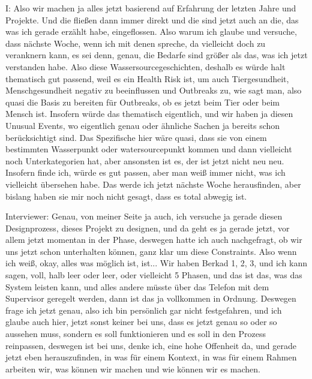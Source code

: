 I: Also wir machen ja alles jetzt basierend auf Erfahrung der letzten Jahre und Projekte. Und die fließen dann immer direkt und die sind jetzt auch an die, das was ich gerade erz{\"a}hlt habe, eingeflossen. Also warum ich glaube und versuche, dass n{\"a}chste Woche, wenn ich mit denen spreche, da vielleicht doch zu veranknern kann, es sei denn, genau, die Bedarfe sind gr{\"o}ßer als das, was ich jetzt verstanden habe. Also diese Wassersourcegeschichten, deshalb es w{\"u}rde halt thematisch gut passend, weil es ein Health Risk ist, um auch Tiergesundheit, Menschgesundheit negativ zu beeinflussen und Outbreaks zu, wie sagt man, also quasi die Basis zu bereiten f{\"u}r Outbreaks, ob es jetzt beim Tier oder beim Mensch ist. Insofern w{\"u}rde das thematisch eigentlich, und wir haben ja diesen Unusual Events, wo eigentlich genau oder {\"a}hnliche Sachen ja bereits schon ber{\"u}cksichtigt sind. Das Spezifische hier w{\"a}re quasi, dass sie von einem bestimmten Wasserpunkt oder watersourcepunkt kommen und dann vielleicht noch Unterkategorien hat, aber ansonsten ist es, der ist jetzt nicht neu neu. Insofern finde ich, w{\"u}rde es gut passen, aber man weiß immer nicht, was ich vielleicht {\"u}bersehen habe. Das werde ich jetzt n{\"a}chste Woche herausfinden, aber bislang haben sie mir noch nicht gesagt, dass es total abwegig ist. 

Interviewer: Genau, von meiner Seite ja auch, ich versuche ja gerade diesen Designprozess, dieses Projekt zu designen, und da geht es ja gerade jetzt, vor allem jetzt momentan in der Phase, deswegen hatte ich auch nachgefragt, ob wir uns jetzt schon unterhalten k{\"o}nnen, ganz klar um diese Constraints. Also wenn ich weiß, okay, alles was m{\"o}glich ist, ist... Wir haben Berkad  1, 2, 3, und ich kann sagen, voll, halb leer oder leer, oder vielleicht 5 Phasen, und das ist das, was das System leisten kann, und alles andere m{\"u}sste {\"u}ber das Telefon mit dem Supervisor geregelt werden, dann ist das ja vollkommen in Ordnung. Deswegen frage ich jetzt genau, also ich bin pers{\"o}nlich gar nicht festgefahren, und ich glaube auch hier, jetzt sonst keiner bei uns, dass es jetzt genau so oder so aussehen muss, sondern es soll funktionieren und es soll in den Prozess reinpassen, deswegen ist bei uns, denke ich, eine hohe Offenheit da, und gerade jetzt eben herauszufinden, in was f{\"u}r einem Kontext, in was f{\"u}r einem Rahmen arbeiten wir, was k{\"o}nnen wir machen und wie k{\"o}nnen wir es machen. 

